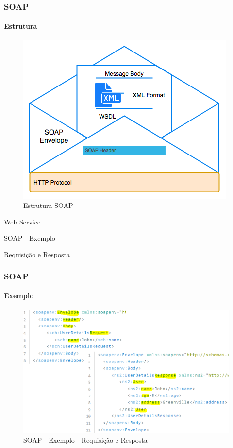 \documentclass[
	9pt, %
	t, %
]{beamer}
\begin{document}
\begin{frame}
	\frametitle{SOAP}
	\framesubtitle{Estrutura}

	\begin{figure}
		\centering
		\includegraphics[width=0.7\linewidth]{soap_structure.png}
		\caption{Estrutura SOAP}
		\label{fig:soap}
	\end{figure}

\end{frame}

\begin{frame}
	\begin{center}

		\bigskip\bigskip\bigskip\bigskip %
		{\Large Web Service}

		\bigskip\bigskip %
		{\Huge SOAP - Exemplo}

		\smallskip
		{\small Requisição e Resposta}
	\end{center}

\end{frame}

\begin{frame}
	\frametitle{SOAP}
	\framesubtitle{Exemplo}

	\begin{figure}
		\includegraphics[width=0.8\linewidth]{soap_example_user.png}
		\caption{SOAP - Exemplo - Requisição e Resposta}
		\label{fig:soap_example_user}
	\end{figure}

\end{frame}
\end{document}
